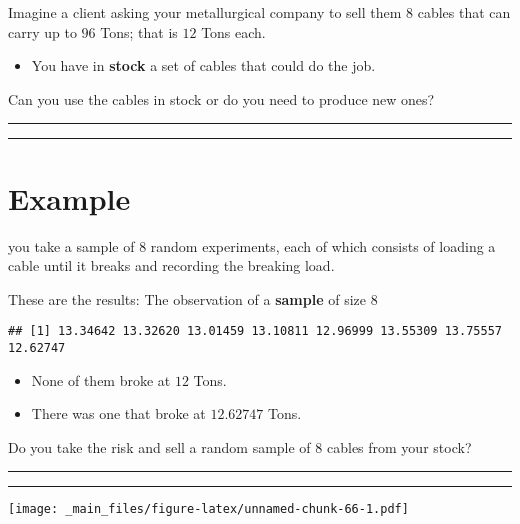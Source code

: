 \documentclass[
]{book}
\providecommand{\tightlist}{%
  \setlength{\itemsep}{0pt}\setlength{\parskip}{0pt}}
\begin{document}
Imagine a client asking your metallurgical company to sell them \(8\) cables that can carry up to \(96\) Tons; that is \(12\) Tons each.

\begin{itemize}
\tightlist
\item
  You have in \textbf{stock} a set of cables that could do the job.
\end{itemize}

Can you use the cables in stock or do you need to produce new ones?

\begin{center}\rule{0.5\linewidth}{0.5pt}\end{center}

\begin{center}\rule{0.5\linewidth}{0.5pt}\end{center}

\hypertarget{example-13}{%
\section{Example}\label{example-13}}

you take a sample of \(8\) random experiments, each of which consists of loading a cable until it breaks and recording the breaking load.

These are the results: The observation of a \textbf{sample} of size \(8\)

\begin{verbatim}
## [1] 13.34642 13.32620 13.01459 13.10811 12.96999 13.55309 13.75557 12.62747
\end{verbatim}

\begin{itemize}
\item
  None of them broke at \(12\) Tons.
\item
  There was one that broke at \(12.62747\) Tons.
\end{itemize}

Do you take the risk and sell a random sample of \(8\) cables from your stock?

\begin{center}\rule{0.5\linewidth}{0.5pt}\end{center}

\begin{center}\rule{0.5\linewidth}{0.5pt}\end{center}

\texttt{[image: \_main\_files/figure-latex/unnamed-chunk-66-1.pdf]}
\end{document}
